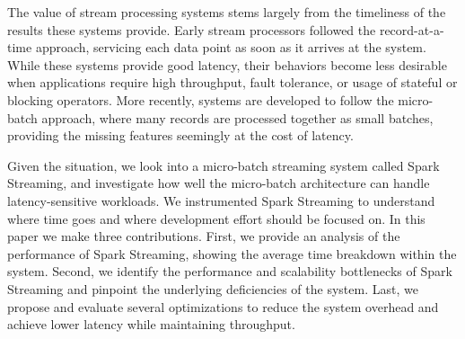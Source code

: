 The value of stream processing systems stems largely from the timeliness of the results these systems provide.
Early stream processors followed the record-at-a-time approach, servicing each data point as soon as it arrives at the system. While these systems provide good latency, their behaviors become less desirable when applications require high throughput, fault tolerance, or usage of stateful or blocking operators. More recently, systems are developed to follow the micro-batch approach, where many records are processed together as small batches, providing the missing features seemingly at the cost of latency.

Given the situation, we look into a micro-batch streaming system called Spark Streaming, and investigate how well the micro-batch architecture can handle latency-sensitive workloads. 
We instrumented Spark Streaming to understand where time goes and where development effort should be focused on.
In this paper we make three contributions. 
First, we provide an analysis of the performance of Spark Streaming, showing the average time breakdown within the system. 
Second, we identify the performance and scalability bottlenecks of Spark Streaming and pinpoint the underlying deficiencies of the system. 
Last, we propose and evaluate several optimizations to reduce the system overhead and achieve lower latency while maintaining throughput.
        

